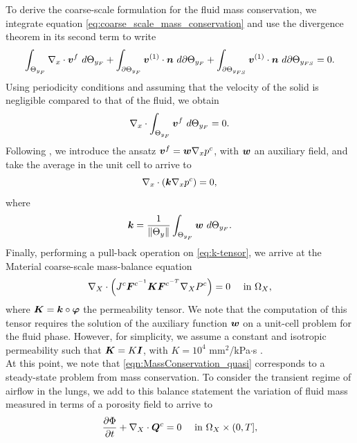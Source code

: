 \documentclass[preprint,3p,12pt,number,sort&compress]{elsarticle}
\def\vec   #1{\text{\boldmath $#1$}{}}
\def\ten   #1{\text{\boldmath $#1$}{}}
\begin{document}
To derive the coarse-scale formulation for the fluid mass conservation, we integrate equation \eqref{eq:coarse_scale_mass_conservation} and use the divergence theorem in its second term to write
\begin{equation}
\int_{\Theta_{y_F}}\nabla_x \cdot \vec v^{f} \ d \Theta_{y_F} + 
 \int_{\partial \Theta_{y_F}}  \vec v^{(1)} \cdot \vec n   \ d \partial  \Theta_{y_F} + 
 \int_{\partial \Theta_{y_{FS}}}  \vec v^{(1)} \cdot \vec n   \ d \partial  \Theta_{y_{FS}} = 0.
\end{equation}
Using periodicity conditions and assuming that the velocity of the solid is negligible compared to that of the fluid, we obtain
\begin{equation}
	\nabla_x \cdot\int_{\Theta_{y_F}} \vec v^{f} \ d  \Theta_{y_F} = 0.
\end{equation}
Following \cite{fish2013practical}, we introduce the ansatz $\vec v^{f} = \ten w  \nabla_x p^c$, with $\vec w$ an auxiliary field, and take the average in the unit cell to arrive to
\begin{equation}
	\nabla_x \cdot \left( \ten k  \nabla_x p^{c} \right)  = 0, 
\end{equation}
where
\begin{equation}
	\ten k = \frac{1}{\| \Theta_{y} \|}  \int_{\Theta_{y_F}} \ten w \ d \Theta_{y_F}. 
	\label{eq:k-tensor}
\end{equation} 
Finally, performing a pull-back operation on \eqref{eq:k-tensor}, 
we arrive at the Material coarse-scale mass-balance equation
\begin{align}
	\nabla_X \cdot \left(  J^c \ten F^{c^{-1}} \ten K \ten F^{c^{-T}} \nabla_X P^c       \right)  = 0 \label{eqn:MassConservation_quasi}
	\quad \mbox{ in $\Omega_X$},
\end{align}
where $\ten K = \ten k \circ \vec \varphi$ the permeability tensor. We note that the computation of this tensor requires the solution of the auxiliary function $\vec w$ on a unit-cell problem for the fluid phase. However, for simplicity, we assume a constant and isotropic permeability such that $\ten K=K \ten I$, with $K=10^{4}$ mm$^2$/kPa$\cdot$s \cite{berger2016poroelastic,avileshurtado2022whole}.\\
At this point, we note that \eqref{eqn:MassConservation_quasi} corresponds to a steady-state problem from mass conservation. To consider the transient regime of airflow in the lungs, we add to this balance statement the variation of fluid mass measured in terms of a  porosity field to arrive to
\begin{equation}
\frac{\partial \Phi}{\partial t} +\nabla_X \cdot \vec{Q}^c = 0  \quad \mbox{ in $\Omega_X \times (0,T]$},	\label{eqn:MassConservation_temporal}
\end{equation}
\end{document}
